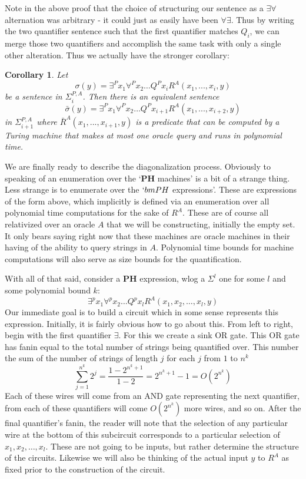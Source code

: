 \documentclass{article}
\theoremstyle{definition}
\theoremstyle{plain}
\theoremstyle{theorem}
\newtheorem{corollary}{Corollary}[section]
\begin{document}
Note in the above proof that the choice of structuring our sentence as a $\exists \forall$ alternation was arbitrary - it could just as easily have been $\forall \exists$. Thus by writing the two quantifier sentence such that the first quantifier matches $Q_i$, we can merge those two quantifiers and accomplish the same task with only a single other alteration. Thus we actually have the stronger corollary:
\begin{corollary}
		Let \[\sigma(y) = \exists^Px_1\forall^P x_2 \ldots Q^P x_iR^A(x_1,...,x_i,y) \]
	be a sentence in $\Sigma^{P,A}_i$. Then there is an equivalent sentence 
	\[ \bar{\sigma}(y) = \exists^Px_1\forall^P x_2 \ldots Q^P x_{i+1}R^A(x_1,...,x_{i+2},y) \]
	in $\Sigma^{P,A}_{i+1	}$ where $\bar{R}^A(x_1,...,x_{i+1},y)$ is a predicate that can be computed by a Turing machine that makes at most one oracle query and runs in polynomial time. 
\end{corollary}
We are finally ready to describe the diagonalization process. Obviously to speaking of an enumeration over the `$\bm{PH}$ machines' is a bit of a strange thing. Less strange is to enumerate over the $`bm{PH}$ expressions'. These are expressions of the form above, which implicitly is defined via an enumeration over all polynomial time computations for the sake of $R^A$. These are of course all relativized over an oracle $A$ that we will be constructing, initially the empty set. It only bears saying right now that these machines are oracle machines in their having of the ability to query strings in $A$. Polynomial time bounds for machine computations will also serve as size bounds for the quantification. \par 
With all of that said, consider a $\bm{PH}$ expression, wlog a $\Sigma^l$ one for some $l$ and some polynomial bound $k$:
\[ \exists^p x_1 \forall^p x_2 \ldots Q^p x_l R^A(x_1,x_2,\ldots,x_l,y) \]
Our immediate goal is to build a circuit which in some sense represents this expression. Initially, it is fairly obvious how to go about this. From left to right, begin with the first quantifier $\exists$. For this we create a sink OR gate. This OR gate has fanin equal to the total number of strings being quantified over. This number the sum of the number of strings of length $j$ for each $j$ from $1$ to $n^k$
\[ \sum_{j=1}^{n^k} 2^j = \frac{1-2^{n^k+1}}{1-2} = 2^{n^k+1}-1 = O(2^{n^k}) \]
Each of these wires will come from an AND gate representing the next quantifier, from each of these quantifiers will come $O(2^{n^k})$ more wires, and so on. After the final quantifier's fanin, the reader will note that the selection of any particular wire at the bottom of this subcircuit corresponds to a particular selection of $x_1,x_2,\ldots,x_l$. These are not going to be inputs, but rather determine the structure of the circuits. Likewise we will also be thinking of the actual input $y$ to $R^A$ as fixed prior to the construction of the circuit.  \par 
\end{document}
